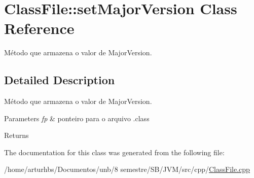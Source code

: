 \hypertarget{classClassFile_1_1setMajorVersion}{}\section{Class\+File\+:\+:set\+Major\+Version Class Reference}
\label{classClassFile_1_1setMajorVersion}


Método que armazena o valor de Major\+Version.  




\subsection{Detailed Description}
Método que armazena o valor de Major\+Version. 


\begin{DoxyParams}{Parameters}
{\em fp} & ponteiro para o arquivo .class \\
\hline
\end{DoxyParams}
\begin{DoxyReturn}{Returns}

\end{DoxyReturn}


The documentation for this class was generated from the following file\+:\begin{DoxyCompactItemize}
\item 
/home/arturhbs/\+Documentos/unb/8 semestre/\+S\+B/\+J\+V\+M/src/cpp/\hyperlink{ClassFile_8cpp}{Class\+File.\+cpp}\end{DoxyCompactItemize}
